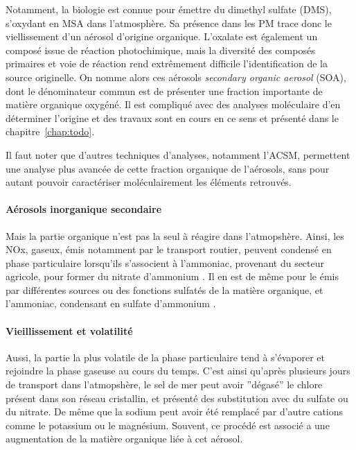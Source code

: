 Notamment, la biologie est connue pour émettre du dimethyl sulfate (DMS), s'oxydant en
MSA dans l'atmosphère. Sa présence dans les PM trace donc le viellissement d'un aérosol
d'origine organique.  L'oxalate est également un composé issue de réaction photochimique,
mais la diversité des composés primaires et voie de réaction rend extrêmement difficile
l'identification de la source originelle.
On nomme alors ces aérosols \textit{secondary organic aerosol} (SOA), dont le
dénominateur commun est de présenter une fraction importante de matière organique
oxygéné. Il est compliqué avec des analyses moléculaire d'en déterminer l'origine et des
travaux sont en cours en ce sens et présenté dans le chapitre~\ref{chap:todo}.

Il faut noter que d'autres techniques d'analyses, notamment l'ACSM, permettent une
analyse plus avancée de cette fraction organique de l'aérosols, sans pour autant pouvoir
caractériser moléculairement les éléments retrouvés.

\paragraph{Aérosols inorganique secondaire}%
\label{par:aérosols_inorganique_secondaire}

Mais la partie organique n'est pas la seul à réagire dans l'atmopshère. Ainsi, les NOx,
gaseux, émis notamment par le transport routier, peuvent condensé en phase particulaire
lorsqu'ils s'associent à l'ammoniac, provenant du secteur agricole, pour former du
nitrate d'ammonium . Il en est de même pour le  émis par différentes
sources ou des fonctions sulfatés de la matière organique, et l'ammoniac, condensant en
sulfate d'ammonium .

\paragraph{Vieillissement et volatilité}%
\label{par:vieillissement_et_volatilité}

Aussi, la partie la plus volatile de la phase particulaire tend à s'évaporer et rejoindre
la phase gaseuse au cours du temps. C'est ainsi qu'après plusieurs jours de transport
dans l'atmopshère, le sel de mer peut avoir ''dégasé'' le chlore présent dans son réseau
cristallin, et présenté des substitution avec du sulfate ou du nitrate. De même que la
sodium peut avoir été remplacé par d'autre cations comme le potassium ou le magnésium.
Souvent, ce procédé est associé a une augmentation de la matière organique liée à cet
aérosol.

